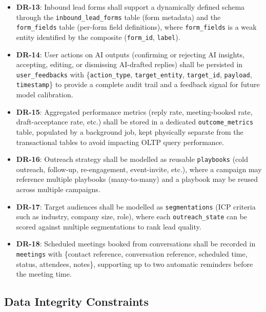 \documentclass[a4paper]{article}
\begin{document}
\begin{itemize}
    \item \textbf{DR-13}: Inbound lead forms shall support a
    dynamically defined schema through the
    \texttt{inbound\_lead\_forms} table (form metadata) and the
    \texttt{form\_fields} table (per-form field definitions),
    where \texttt{form\_fields} is a weak entity identified by
    the composite (\texttt{form\_id}, \texttt{label}).

    \item \textbf{DR-14}: User actions on AI outputs (confirming
    or rejecting AI insights, accepting, editing, or dismissing
    AI-drafted replies) shall be persisted in
    \texttt{user\_feedbacks} with
    \{\texttt{action\_type}, \texttt{target\_entity},
    \texttt{target\_id}, \texttt{payload}, \texttt{timestamp}\}
    to provide a complete audit trail and a feedback signal for
    future model calibration.

    \item \textbf{DR-15}: Aggregated performance metrics (reply
    rate, meeting-booked rate, draft-acceptance rate, etc.) shall
    be stored in a dedicated \texttt{outcome\_metrics} table,
    populated by a background job, kept physically separate from
    the transactional tables to avoid impacting OLTP query
    performance.

    \item \textbf{DR-16}: Outreach strategy shall be modelled as
    reusable \texttt{playbooks} (cold outreach, follow-up,
    re-engagement, event-invite, etc.), where a campaign may
    reference multiple playbooks (many-to-many) and a playbook
    may be reused across multiple campaigns.

    \item \textbf{DR-17}: Target audiences shall be modelled as
    \texttt{segmentations} (ICP criteria such as industry,
    company size, role), where each \texttt{outreach\_state} can
    be scored against multiple segmentations to rank lead
    quality.

    \item \textbf{DR-18}: Scheduled meetings booked from
    conversations shall be recorded in \texttt{meetings} with
    \{contact reference, conversation reference, scheduled time,
    status, attendees, notes\}, supporting up to two automatic
    reminders before the meeting time.
\end{itemize}

\subsection{Data Integrity Constraints}
\end{document}
